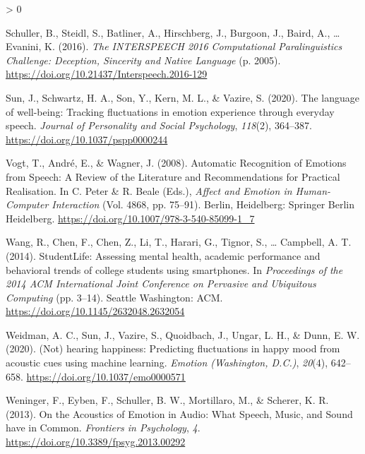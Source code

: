 \documentclass[
  english,
  man,floatsintext]{apa6}
\newlength{\cslhangindent}
\newenvironment{CSLReferences}[2] %
 {%
  \setlength{\parindent}{0pt}
  \ifodd #1 \everypar{\setlength{\hangindent}{\cslhangindent}}\ignorespaces\fi
  \ifnum #2 > 0
  \setlength{\parskip}{#2\baselineskip}
  \fi
 }%
 {}
\begin{document}
\begin{CSLReferences}{1}{0}
\leavevmode\hypertarget{ref-schullerINTERSPEECH2016Computational2016}{}%
Schuller, B., Steidl, S., Batliner, A., Hirschberg, J., Burgoon, J., Baird, A., \ldots{} Evanini, K. (2016). \emph{The {INTERSPEECH} 2016 {Computational Paralinguistics Challenge}: Deception, {Sincerity} and {Native Language}} (p. 2005). \url{https://doi.org/10.21437/Interspeech.2016-129}

\leavevmode\hypertarget{ref-sunLanguageWellbeingTracking2020}{}%
Sun, J., Schwartz, H. A., Son, Y., Kern, M. L., \& Vazire, S. (2020). The language of well-being: Tracking fluctuations in emotion experience through everyday speech. \emph{Journal of Personality and Social Psychology}, \emph{118}(2), 364--387. \url{https://doi.org/10.1037/pspp0000244}

\leavevmode\hypertarget{ref-vogtAutomaticRecognitionEmotions2008}{}%
Vogt, T., André, E., \& Wagner, J. (2008). Automatic {Recognition} of {Emotions} from {Speech}: A {Review} of the {Literature} and {Recommendations} for {Practical Realisation}. In C. Peter \& R. Beale (Eds.), \emph{Affect and {Emotion} in {Human}-{Computer Interaction}} (Vol. 4868, pp. 75--91). {Berlin, Heidelberg}: {Springer Berlin Heidelberg}. \url{https://doi.org/10.1007/978-3-540-85099-1_7}

\leavevmode\hypertarget{ref-wangStudentLifeAssessingMental2014}{}%
Wang, R., Chen, F., Chen, Z., Li, T., Harari, G., Tignor, S., \ldots{} Campbell, A. T. (2014). {StudentLife}: Assessing mental health, academic performance and behavioral trends of college students using smartphones. In \emph{Proceedings of the 2014 {ACM International Joint Conference} on {Pervasive} and {Ubiquitous Computing}} (pp. 3--14). {Seattle Washington}: {ACM}. \url{https://doi.org/10.1145/2632048.2632054}

\leavevmode\hypertarget{ref-weidmanNotHearingHappiness2020}{}%
Weidman, A. C., Sun, J., Vazire, S., Quoidbach, J., Ungar, L. H., \& Dunn, E. W. (2020). ({Not}) hearing happiness: Predicting fluctuations in happy mood from acoustic cues using machine learning. \emph{Emotion (Washington, D.C.)}, \emph{20}(4), 642--658. \url{https://doi.org/10.1037/emo0000571}

\leavevmode\hypertarget{ref-weningerAcousticsEmotionAudio2013}{}%
Weninger, F., Eyben, F., Schuller, B. W., Mortillaro, M., \& Scherer, K. R. (2013). On the {Acoustics} of {Emotion} in {Audio}: What {Speech}, {Music}, and {Sound} have in {Common}. \emph{Frontiers in Psychology}, \emph{4}. \url{https://doi.org/10.3389/fpsyg.2013.00292}


\end{CSLReferences}
\end{document}
